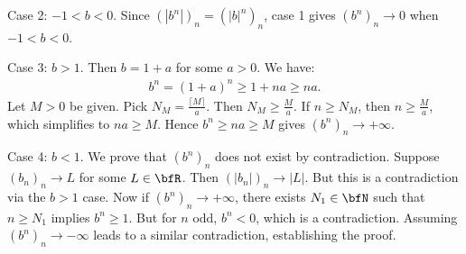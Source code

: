 \begin{example}
\begin{enumerate}[label = (\arabic*)]
\begin{solution}
                    Case 2: $-1 < b < 0$. Since $(|b^n|)_n = (|b|^n)_n$, case 1 gives $(b^n)_n \rightarrow 0$ when $-1<b<0$.

                    Case 3: $b >1$. Then $b = 1+a$ for some $a > 0$. We have:
                        \begin{equation*}
                        \begin{split}
                            b^n = (1+a)^n \geq 1+na \geq na.
                        \end{split}
                        \end{equation*}
                    Let $M>0$ be given. Pick $N_M = \frac{\lceil M \rceil}{a}$. Then $N_M \geq \frac{M}{a}$. If $n \geq N_M$, then $n \geq \frac{M}{a}$, which simplifies to $na \geq M$. Hence $b^n \geq na \geq M$ gives $(b^n)_n \rightarrow +\infty$.

                    Case 4: $b < 1$. We prove that $(b^n)_n$ does not exist by contradiction. Suppose $(b_n)_n \rightarrow L$ for some $L \in \bfR$. Then $(|b_n|)_n \rightarrow |L|$. But this is a contradiction via the $b>1$ case. Now if $(b^n)_n \rightarrow +\infty$, there exists $N_1 \in \bfN$ such that $n\geq N_1$ implies $b^n \geq 1$. But for $n$ odd, $b^n <0$, which is a contradiction. Assuming $(b^n)_n \rightarrow -\infty$ leads to a similar contradiction, establishing the proof.
                \end{solution}
        \end{enumerate}
    \end{example}

